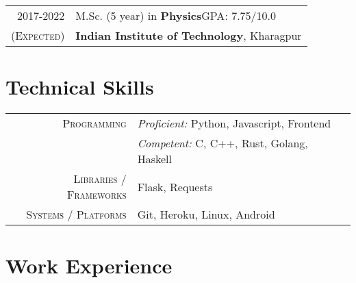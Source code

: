 \documentclass[a4paper,10pt]{extarticle} %
\begin{document}
\begin{tabular}{r|p{16.25cm}}	
2017-2022 & M.Sc. (5 year) in \textbf{Physics}\hfill\textsc{GPA}: 7.75/10.0\\
\textsc{(Expected)}&\textbf{Indian Institute of Technology}, Kharagpur\\
\end{tabular}


\vspace{1cm}



\section{\textcolor{primary}{Technical Skills}}

\begin{tabular}{r|p{13cm}}
\textsc{Programming} & \textit{Proficient:} Python, Javascript, Frontend\\
& \textit{Competent:} C, C++, Rust, Golang, Haskell \\
\textsc{Libraries / Frameworks} & Flask, Requests\\
\textsc{Systems / Platforms} & Git, Heroku, Linux, Android\\
\end{tabular}

\vspace{1cm}




\section{\textcolor{primary}{Work Experience}}
\end{document}
